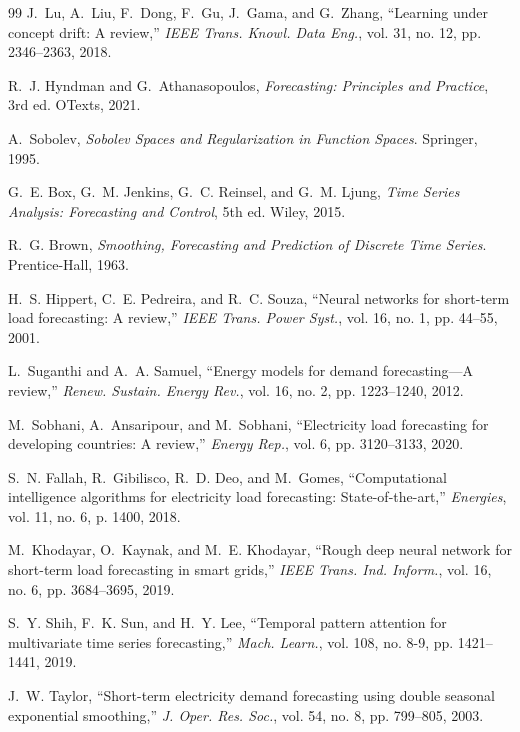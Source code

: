 \documentclass[11pt,letterpaper]{article}
\begin{document}
\begin{thebibliography}{99}
J.~Lu, A.~Liu, F.~Dong, F.~Gu, J.~Gama, and G.~Zhang, ``Learning under concept drift: A review,'' \emph{IEEE Trans. Knowl. Data Eng.}, vol. 31, no. 12, pp. 2346--2363, 2018.

R.~J. Hyndman and G.~Athanasopoulos, \emph{Forecasting: Principles and Practice}, 3rd ed. OTexts, 2021.

A.~Sobolev, \emph{Sobolev Spaces and Regularization in Function Spaces}. Springer, 1995.

G.~E. Box, G.~M. Jenkins, G.~C. Reinsel, and G.~M. Ljung, \emph{Time Series Analysis: Forecasting and Control}, 5th ed. Wiley, 2015.

R.~G. Brown, \emph{Smoothing, Forecasting and Prediction of Discrete Time Series}. Prentice-Hall, 1963.

H.~S. Hippert, C.~E. Pedreira, and R.~C. Souza, ``Neural networks for short-term load forecasting: A review,'' \emph{IEEE Trans. Power Syst.}, vol. 16, no. 1, pp. 44--55, 2001.

L.~Suganthi and A.~A. Samuel, ``Energy models for demand forecasting---A review,'' \emph{Renew. Sustain. Energy Rev.}, vol. 16, no. 2, pp. 1223--1240, 2012.

M.~Sobhani, A.~Ansaripour, and M.~Sobhani, ``Electricity load forecasting for developing countries: A review,'' \emph{Energy Rep.}, vol. 6, pp. 3120--3133, 2020.

S.~N. Fallah, R.~Gibilisco, R.~D. Deo, and M.~Gomes, ``Computational intelligence algorithms for electricity load forecasting: State-of-the-art,'' \emph{Energies}, vol. 11, no. 6, p. 1400, 2018.

M.~Khodayar, O.~Kaynak, and M.~E. Khodayar, ``Rough deep neural network for short-term load forecasting in smart grids,'' \emph{IEEE Trans. Ind. Inform.}, vol. 16, no. 6, pp. 3684--3695, 2019.

S.~Y. Shih, F.~K. Sun, and H.~Y. Lee, ``Temporal pattern attention for multivariate time series forecasting,'' \emph{Mach. Learn.}, vol. 108, no. 8-9, pp. 1421--1441, 2019.

J.~W. Taylor, ``Short-term electricity demand forecasting using double seasonal exponential smoothing,'' \emph{J. Oper. Res. Soc.}, vol. 54, no. 8, pp. 799--805, 2003.


\end{thebibliography}
\end{document}
